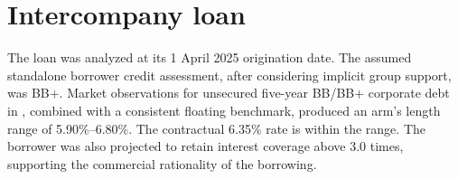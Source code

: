 \section{Intercompany loan}
The loan was analyzed at its 1 April 2025 origination date. The assumed standalone
borrower credit assessment, after considering implicit group support, was BB+.
Market observations for unsecured five-year BB/BB+ corporate debt in \Currency,
combined with a consistent floating benchmark, produced an arm's length range of
5.90\%--6.80\%. The contractual 6.35\% rate is within the range. The borrower was
also projected to retain interest coverage above 3.0 times, supporting the
commercial rationality of the borrowing.
